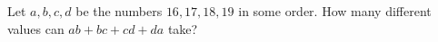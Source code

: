 Let $a,b,c,d$ be the numbers $16,17,18,19$ in some order. How many different values can $ab+bc+cd+da$ take?

